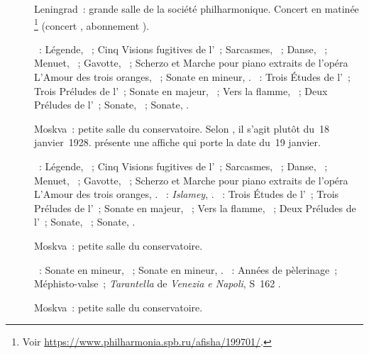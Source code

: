 \begin{description}
 \item[]
 Leningrad~: grande salle de la société philharmonique.
 Concert en matinée%
 \footnote{Voir \href{https://www.philharmonia.spb.ru/afisha/199701/}%
 {https://www.philharmonia.spb.ru/afisha/199701/}.}
 (concert , abonnement ).

 \textsc{\Prokofiev{}}~: Légende,  ~; Cinq Visions
 fugitives de l'~; Sarcasmes, ~; Danse, 
 ~; Menuet,  ~; Gavotte,  ~;
 Scherzo et Marche pour piano extraits de l'opéra L'Amour des trois oranges,
 ~; Sonate en \kA mineur, .
 \textsc{\Scriabine{}}~: Trois Études de l'~; Trois Préludes de
 l'~; Sonate en \kF \Sharp majeur, ~; Vers la flamme,
 ~; Deux Préludes de l'~; Sonate, ~; Sonate,
 .
 \item[]
 Moskva~: petite salle du conservatoire.
 Selon \Vizel{}, il s'agit plutôt du~18 janvier~1928.
 \citet{Lazarev20} présente une affiche qui porte la date du~19 janvier.

 \textsc{\Prokofiev{}}~: Légende,  ~; Cinq Visions
 fugitives de l'~; Sarcasmes, ~; Danse, 
 ~; Menuet,  ~; Gavotte,  ~;
 Scherzo et Marche pour piano extraits de l'opéra L'Amour des trois oranges,
 .
 \textsc{\Balakirev{}}~: \emph{Islamey}, .
 \textsc{\Scriabine{}}~: Trois Études de l'~; Trois Préludes de
 l'~; Sonate en \kF \Sharp majeur, ~; Vers la flamme,
 ~; Deux Préludes de l'~; Sonate, ~; Sonate,
 .
 \item[]
 Moskva~: petite salle du conservatoire.

 \textsc{\Beethoven{}}~: Sonate en \kC \Sharp mineur,  ~;
 Sonate en \kF mineur, .
 \textsc{\Liszt{}}~: Années de pèlerinage~; Méphisto-valse~;
 \emph{Tarantella} de \emph{Venezia e Napoli}, S~162 .
 \item[]
 Moskva~: petite salle du conservatoire.


\end{description}

